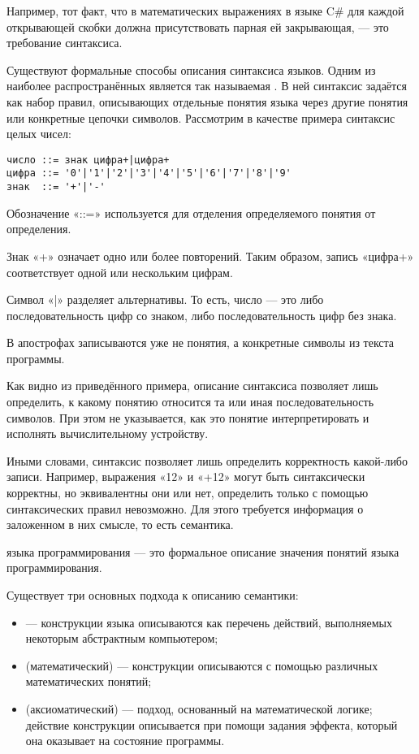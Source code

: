 Например, тот факт, что в математических выражениях в языке C\# для
каждой открывающей скобки должна присутствовать парная ей
закрывающая, — это требование синтаксиса.


Существуют формальные способы описания синтаксиса языков. Одним из
наиболее распространённых является так называемая . В ней синтаксис задаётся как
набор правил, описывающих отдельные понятия языка через другие понятия
или конкретные цепочки символов. Рассмотрим в качестве примера
синтаксис целых чисел:

\begin{verbatim}
число ::= знак цифра+|цифра+
цифра ::= '0'|'1'|'2'|'3'|'4'|'5'|'6'|'7'|'8'|'9'
знак  ::= '+'|'-'
\end{verbatim}

Обозначение «::=» используется для отделения определяемого понятия от
определения.

Знак «+» означает одно или более повторений. Таким образом, запись
«цифра+» соответствует одной или нескольким цифрам.

Символ «|» разделяет альтернативы. То есть, число — это либо
последовательность цифр со знаком, либо последовательность цифр без
знака.

В апострофах записываются уже не понятия, а конкретные символы из
текста программы.


Как видно из приведённого примера, описание синтаксиса позволяет лишь
определить, к какому понятию относится та или иная последовательность
символов.  При этом не указывается, как это понятие интерпретировать и
исполнять вычислительному устройству.

Иными словами, синтаксис позволяет лишь определить корректность какой-либо
записи. Например, выражения «12» и «+12» могут быть синтаксически
корректны, но эквивалентны они или нет, определить только с помощью
синтаксических правил невозможно. Для этого требуется информация о
заложенном в них смысле, то есть семантика.

\begin{defn}
 языка программирования — это формальное описание
значения понятий языка программирования.
\end{defn}

Существует три основных подхода к описанию семантики:

\begin{itemize}
\item {} — конструкции языка
  описываются как перечень действий, выполняемых некоторым абстрактным
  компьютером;
\item {} (математический) —
  конструкции описываются с помощью различных математических понятий;
\item {} (аксиоматический)
  — подход, основанный на математической логике; действие конструкции
  описывается при помощи задания эффекта, который она оказывает на
  состояние программы.
\end{itemize}


